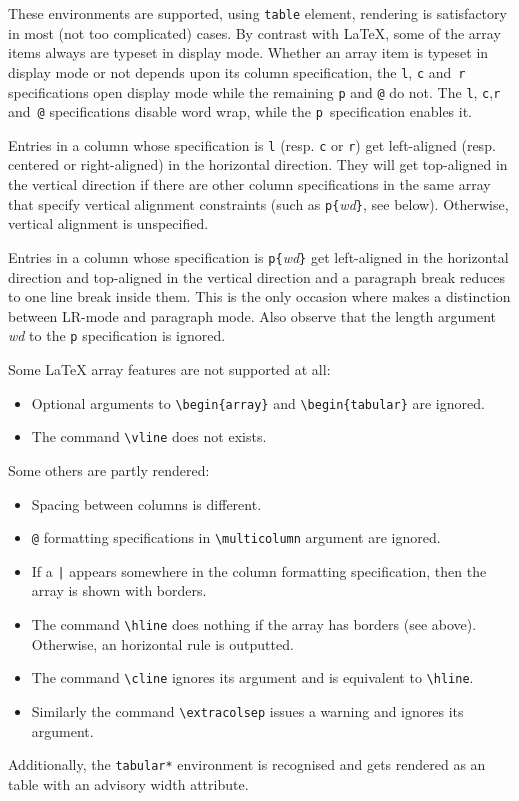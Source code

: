These environments are supported, using \html{}
\verb+table+ element, rendering is satisfactory in most (not too
complicated) cases.
By contrast with \LaTeX{},
some of the array items always are typeset in display mode.
Whether an array item is typeset in display mode or not depends upon
its column specification,
the \verb+l+, \verb+c+ and~\verb+r+ specifications open display mode
while the remaining \verb+p+ and \verb+@+ do not.
The \verb+l+, \verb+c+,\verb+r+ and~\verb+@+ specifications
disable word wrap, while the \verb+p+~specification enables it.

Entries in a column whose specification is \verb+l+ (resp. \verb+c+ or
\verb+r+) get left-aligned (resp. centered or right-aligned)
in the horizontal direction.
They will get top-aligned in the vertical direction if there are
other column specifications in the
same array that specify vertical alignment constraints
(such as \verb+p{+\textit{wd}\verb+}+, see below).
Otherwise, vertical alignment is unspecified.

Entries in a column whose specification is \verb+p{+{\it wd}\verb+}+
get left-aligned in the horizontal direction and
top-aligned in the vertical direction
and a paragraph break reduces to one line break inside them.
This is the only occasion where
\hevea{} makes a distinction between LR-mode and paragraph mode.
Also observe that the length argument \textit{wd} to the \verb+p+
specification is ignored.


Some \LaTeX{} array features are not supported at all:
\begin{itemize}
\item Optional arguments to \verb+\begin{array}+ and
\verb+\begin{tabular}+ are ignored.
\item The command \verb+\vline+ does not exists.
\end{itemize}

Some others are partly rendered:
\begin{itemize}
\item Spacing between columns is different.
\item \verb+@+ formatting specifications in \verb+\multicolumn+
argument are ignored.
\item If a \verb+|+ appears somewhere in the column formatting
specification, then the array is shown with borders.
\item The command \verb+\hline+ does nothing if the array has borders
(see above). Otherwise, an horizontal rule is outputted.
\item The command \verb+\cline+ ignores its argument and is equivalent
to \verb+\hline+.
\item Similarly the command
\verb+\extracolsep+ issues a warning and ignores its argument.
\end{itemize}
Additionally, the \verb+tabular*+ environment is
recognised and gets rendered as an \html{} table with an advisory
width attribute.


